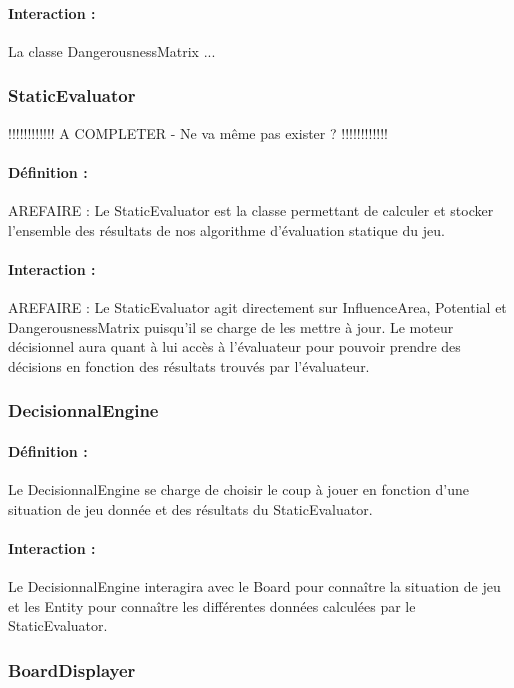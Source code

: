 \documentclass[12pt]{article}
\begin{document}
				\paragraph{Interaction :}
				La classe DangerousnessMatrix ...

			\subsubsection{StaticEvaluator}

				!!!!!!!!!!!! A COMPLETER - Ne va même pas exister ? !!!!!!!!!!!!
				\paragraph{Définition :}
				AREFAIRE : Le StaticEvaluator est la classe permettant de calculer et stocker l'ensemble des résultats de nos algorithme 
				d'évaluation statique du jeu.
				\paragraph{Interaction :}
				AREFAIRE : Le StaticEvaluator agit directement sur InfluenceArea, Potential et DangerousnessMatrix puisqu'il se charge 
				de les mettre à jour. Le moteur décisionnel aura quant à lui accès à l'évaluateur pour pouvoir prendre des décisions en fonction 
				des résultats trouvés par l'évaluateur.

			\subsubsection{DecisionnalEngine}

				\paragraph{Définition :}
				Le DecisionnalEngine se charge de choisir le coup à jouer en fonction d'une situation de jeu donnée et des résultats 
				du StaticEvaluator.
				\paragraph{Interaction :}
				Le DecisionnalEngine interagira avec le Board pour connaître la situation de jeu et les Entity pour connaître les 
				différentes données calculées par le StaticEvaluator.

			\subsubsection{BoardDisplayer}
\end{document}
